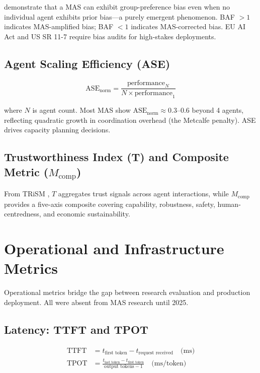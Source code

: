 \documentclass[11pt,a4paper]{article}
\begin{document}
\citet{emergent_bias2024} demonstrate that a MAS can exhibit group-preference bias even
when no individual agent exhibits prior bias—a purely emergent phenomenon. BAF $> 1$
indicates MAS-amplified bias; BAF $< 1$ indicates MAS-corrected bias. EU AI Act and
US SR 11-7 require bias audits for high-stakes deployments.

\subsection{Agent Scaling Efficiency (ASE)}

\begin{equation}
  \text{ASE}_{\text{norm}} = \frac{\text{performance}_N}{N \times \text{performance}_1}
\end{equation}

where $N$ is agent count. Most MAS show $\text{ASE}_{\text{norm}} \approx 0.3$--$0.6$
beyond 4 agents, reflecting quadratic growth in coordination overhead (the Metcalfe
penalty). ASE drives capacity planning decisions.

\subsection{Trustworthiness Index (T) and Composite Metric ($M_{\text{comp}}$)}

From TRiSM \citep{trism2025}, $T$ aggregates trust signals across agent interactions,
while $M_{\text{comp}}$ provides a five-axis composite covering capability, robustness,
safety, human-centredness, and economic sustainability.

\section{Operational and Infrastructure Metrics}
\label{sec:ops}

Operational metrics bridge the gap between research evaluation and production
deployment. All were absent from MAS research until 2025.

\subsection{Latency: TTFT and TPOT}

\begin{align}
  \text{TTFT} &= t_{\text{first token}} - t_{\text{request received}} \quad\text{(ms)} \\
  \text{TPOT} &= \frac{t_{\text{last token}} - t_{\text{first token}}}
                       {\text{output tokens} - 1} \quad\text{(ms/token)}
\end{align}
\end{document}
